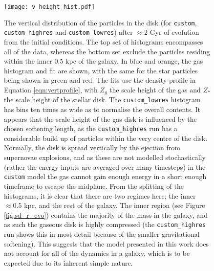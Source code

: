 \begin{figure}
    \centering
    \texttt{[image: v\_height\_hist.pdf]}
    \caption{The vertical distribution of the particles in the disk (for {\tt custom}, {\tt custom\_highres} and {\tt custom\_lowres}) after $\approx 2$ Gyr of evolution from the initial conditions. The top set of histograms encompasses all of the data, whereas the bottom set exclude the particles residing within the inner $0.5$ kpc of the galaxy. In blue and orange, the gas histogram and fit are shown, with the same for the star particles being shown in green and red. The fits use the density profile in Equation \ref{eqn:vertprofile}, with $Z_g$ the scale height of the gas and $Z_*$ the scale height of the stellar disk. The {\tt custom\_lowres} histogram has bins ten times as wide as to normalise the overall contents. It appears that the scale height of the gas disk is influenced by the chosen softening length, as the {\tt custom\_highres} run has a considerable build up of particles within the very centre of the disk. Normally, the disk is spread vertically by the ejection from supernovae explosions, and as these are not modelled stochastically (rather the energy inputs are averaged over many timesteps) in the {\tt custom} model the gas cannot gain enough energy in a short enough timeframe to escape the midplane. From the splitting of the histograms, it is clear that there are two regimes here; the inner $\approx 0.5$ kpc, and the rest of the galaxy. The inner region (see Figure \ref{fig:sd_r_evo}) contains the majority of the mass in the galaxy, and as such the gaseous disk is highly compressed (the {\tt custom\_highres} run shows this in most detail because of the smaller gravitational softening). This suggests that the model presented in this work does not account for all of the dynamics in a galaxy, which is to be expected due to its inherent simple nature.}
    \label{fig:vheighthist}
\end{figure}
